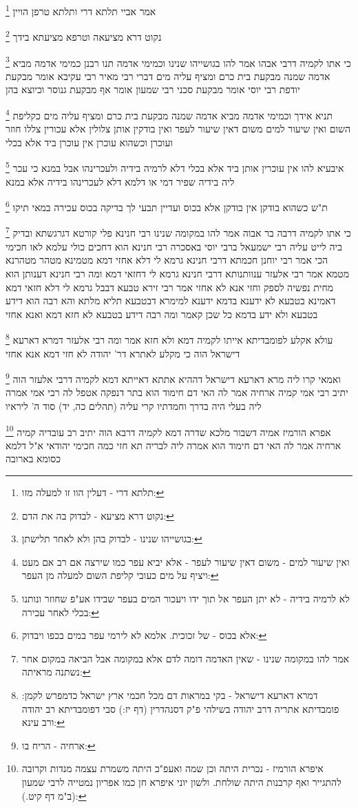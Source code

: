 \documentclass[12pt, openany]{book}
\newcommand{\footnotecomment}[1]{
	\renewcommand\thefootnote{}
	\footnote{#1}}
\newcommand{\commenta}[1]{\footnotecomment{#1}}
\begin{document}
{{\commenta{תלתא דרי - דעלין הוו זו למעלה מזו:}
אמר אביי תלתא דרי ותלתא טרפן הויין
\commenta{נקוט דרא מציעא - לבדוק בה את הדם:}
נקוט דרא מציעאה וטרפא מציעתא בידך 
\commenta{בגושייהו שנינו - לבדוק בהן ולא לאחר תלישתן:}
כי אתו לקמיה דרבי אבהו אמר להו בגושייהו שנינו
וכמימי אדמה תנו רבנן כמימי אדמה מביא אדמה שמנה מבקעת בית כרם ומציף עליה מים דברי רבי מאיר רבי עקיבא אומר מבקעת יודפת רבי יוסי אומר מבקעת סכני רבי שמעון אומר אף מבקעת גנוסר וכיוצא בהן 
\commenta{ואין שיעור למים - משום דאין שיעור לעפר - אלא יביא עפר כמו שירצה אם רב אם מעט ויציף על מים כעובי קליפת השום למעלה מן העפר:}
תניא אידך וכמימי אדמה מביא אדמה שמנה מבקעת בית כרם ומציף עליה מים כקליפת השום ואין שיעור למים משום דאין שיעור לעפר ואין בודקין אותן צלולין אלא עכורין צללו חוזר ועוכרן וכשהוא עוכרן אין עוכרן ביד אלא בכלי 
\commenta{לא לרמיה בידיה - לא יתן העפר אל תוך ידו ויעכור המים בעפר שבידו אע"פ שחוזר ונותנו בכלי לאחר עכירה:}
איבעיא להו אין עוכרין אותן ביד אלא בכלי דלא לרמיה בידיה ולעכרינהו אבל במנא כי עכר ליה בידיה שפיר דמי או דלמא דלא לעכרינהו בידיה אלא במנא 
\commenta{אלא בכוס - של זכוכית. אלמא לא לירמי עפר במים בכפו ויבדוק:}
ת"ש כשהוא בודקן אין בודקן אלא בכוס ועדיין תבעי לך בדיקה בכוס עכירה במאי תיקו 
\commenta{אמר להו במקומה שנינו - שאין האדמה דומה לדם אלא במקומה אבל הביאה במקום אחר נשתנה מראיתה:}
כי אתו לקמיה דרבה בר אבוה אמר להו במקומה שנינו רבי חנינא פלי קורטא דגרגשתא ובדיק ביה לייט עליה רבי ישמעאל ברבי יוסי באסכרה
רבי חנינא הוא דחכים כולי עלמא לאו חכימי הכי 
אמר רבי יוחנן חכמתא דרבי חנינא גרמא לי דלא אחזי דמא מטמינא מטהר מטהרנא מטמא אמר רבי אלעזר ענוותנותא דרבי חנינא גרמא לי דחזאי דמא ומה רבי חנינא דענותן הוא מחית נפשיה לספק וחזי אנא לא אחזי 
אמר רבי זירא טבעא דבבל גרמא לי דלא חזאי דמא דאמינא בטבעא לא ידענא בדמא ידענא 
למימרא דבטבעא תליא מלתא והא רבה הוא דידע בטבעא ולא ידע בדמא כל שכן קאמר ומה רבה דידע בטבעא לא חזא דמא ואנא אחזי 
\commenta{דמרא דארעא דישראל - בקי במראות דם מכל חכמי ארץ ישראל כדמפרש לקמן: פומבדיתא אתריה דרב יהודה בשילהי פ"ק דסנהדרין (דף יז:) סבי דפומבדיתא רב יהודה ורב עינא:}
עולא אקלע לפומבדיתא אייתו לקמיה דמא ולא חזא אמר ומה רבי אלעזר דמרא דארעא דישראל הוה כי מקלע לאתרא דר' יהודה לא חזי דמא אנא אחזי 
\commenta{ארחיה - הריח בו:}
ואמאי קרו ליה מרא דארעא דישראל דההיא אתתא דאייתא דמא לקמיה דרבי אלעזר הוה יתיב רבי אמי קמיה ארחיה אמר לה האי דם חימוד הוא בתר דנפקה אטפל לה רבי אמי אמרה ליה בעלי היה בדרך וחמדתיו קרי עליה (תהלים כה, יד) סוד ה' ליראיו 
\commenta{איפרא הורמיז - נכרית היתה וכן שמה ואעפ"כ היתה משמרת עצמה מנדות וקרובה להתגייר ואף קרבנות היתה שולחת. ולשון יוני איפרא חן כמו אפריון נמטייה לרבי שמעון (ב"מ דף קיט.):}
אפרא הורמיז אמיה דשבור מלכא שדרה דמא לקמיה דרבא הוה יתיב רב עובדיה קמיה ארחיה אמר לה האי דם חימוד הוא אמרה ליה לבריה תא חזי כמה חכימי יהודאי א"ל דלמא כסומא בארובה 
}}
\end{document}
